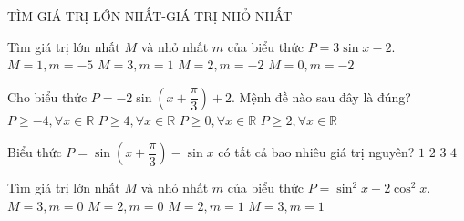 \begin{dang}
    { TÌM GIÁ TRỊ LỚN NHẤT-GIÁ TRỊ NHỎ NHẤT}
\end{dang}

\begin{ex}%
Tìm giá trị lớn nhất $M$ và nhỏ nhất $m$ của biểu thức $P=3\sin x-2.$
\choice
{\True $M=1, m=-5$}
{$M=3, m=1$}
{$M=2, m=-2$}
{$M=0, m=-2$}
\end{ex}

\begin{ex}%
Cho biểu thức $P=-2\sin \left({x+\dfrac{\pi}{3}}\right)+2$. Mệnh đề nào sau đây là đúng?
\choice
{$P\geqslant-4, \forall x\in \mathbb{R}$}
{$P\geqslant 4, \forall x\in \mathbb{R}$}
{\True $P\geqslant 0, \forall x\in \mathbb{R}$}
{$P\geqslant 2, \forall x\in \mathbb{R}$}
\end{ex}

\begin{ex}%
Biểu thức $P=\sin \left({x+\dfrac{\pi}{3}}\right)-\sin x$ có tất cả bao nhiêu giá trị nguyên?
\choice
{$1$}
{$2$}
{\True $3$}
{$4$}
\end{ex}

\begin{ex}%
Tìm giá trị lớn nhất $M$ và nhỏ nhất $m$ của biểu thức $P=\sin ^2x+2\cos ^2x.$
\choice
{$M=3, m=0$}
{$M=2, m=0$}
{\True $M=2, m=1$}
{$M=3, m=1$}
\end{ex}

